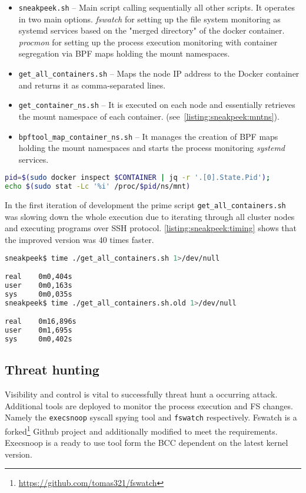 \begin{itemize}[noitemsep]
	\item \texttt{sneakpeek.sh} -- Main script calling sequentially all other scripts. It operates in two main options. \textit{fswatch} for setting up the file system monitoring as systemd services based on the "merged directory" of the docker container. \textit{procmon} for setting up the process execution monitoring with container segregation via BPF maps holding the mount namespaces.
	\item \texttt{get\_all\_containers.sh} -- Maps the node IP address to the Docker container and returns it as comma-separated lines.
	\item \texttt{get\_container\_ns.sh} -- It is executed on each node and essentially retrieves the mount namespace of each container. (see~\autoref{listing:sneakpeek:mntns}).
	\item \texttt{bpftool\_map\_container\_ns.sh} -- It manages the creation of BPF maps holding the mount namespaces and starts the process monitoring \textit{systemd} services.
\end{itemize}

\begin{lstlisting}[language=bash, style=custom, caption={The main piece of script code for retrieving the muont namespace inode number of the given container. This is executed for each container on a corresponding node.}, label=listing:sneakpeek:mntns]
pid=$(sudo docker inspect $CONTAINER | jq -r '.[0].State.Pid');
echo $(sudo stat -Lc '%i' /proc/$pid/ns/mnt)
\end{lstlisting}

In the first iteration of development the prime script \texttt{get\_all\_containers.sh} was slowing down the whole execution due to iterating through all cluster nodes and executing programs over SSH protocol. \autoref{listing:sneakpeek:timing} shows that the improved version was 40 times faster.

\begin{lstlisting}[language=bash, label=listing:sneakpeek:timing]
sneakpeek$ time ./get_all_containers.sh 1>/dev/null

real    0m0,404s
user    0m0,163s
sys     0m0,035s
sneakpeek$ time ./get_all_containers.sh.old 1>/dev/null

real    0m16,896s
user    0m1,695s
sys     0m0,402s
\end{lstlisting}

\subsection{Threat hunting \label{implementation:mon:hunting}}
Visibility and control is vital to successfully threat hunt a occurring attack. Additional tools are deployed to monitor the process execution and FS changes. Namely the \texttt{execsnoop} syscall spying tool and \texttt{fswatch} respectively. Fswatch is a forked\footnote{\url{https://github.com/tomas321/fswatch}} Github project and additionally modified to meet the requirements. Execsnoop is a ready to use tool form the BCC dependent on the latest kernel version.

